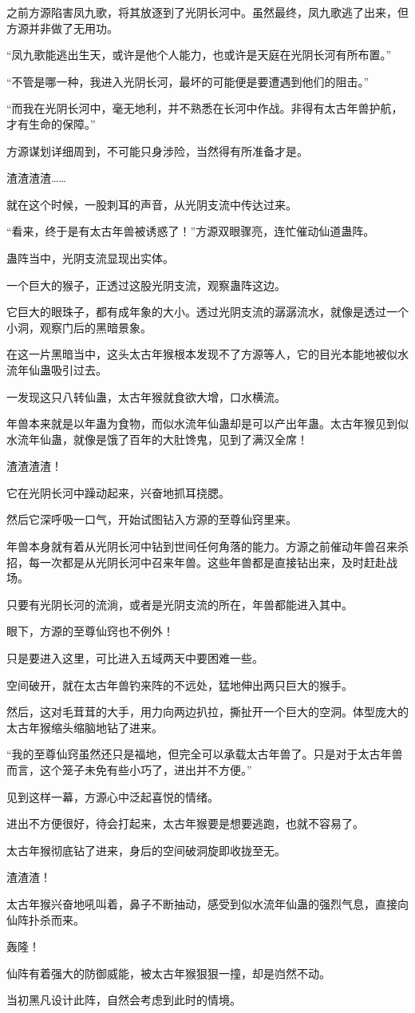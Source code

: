 \begin{this_body}
之前方源陷害凤九歌，将其放逐到了光阴长河中。虽然最终，凤九歌逃了出来，但方源并非做了无用功。

“凤九歌能逃出生天，或许是他个人能力，也或许是天庭在光阴长河有所布置。”

“不管是哪一种，我进入光阴长河，最坏的可能便是要遭遇到他们的阻击。”

“而我在光阴长河中，毫无地利，并不熟悉在长河中作战。非得有太古年兽护航，才有生命的保障。”

方源谋划详细周到，不可能只身涉险，当然得有所准备才是。

渣渣渣渣……

就在这个时候，一股刺耳的声音，从光阴支流中传达过来。

“看来，终于是有太古年兽被诱惑了！”方源双眼骤亮，连忙催动仙道蛊阵。

蛊阵当中，光阴支流显现出实体。

一个巨大的猴子，正透过这股光阴支流，观察蛊阵这边。

它巨大的眼珠子，都有成年象的大小。透过光阴支流的潺潺流水，就像是透过一个小洞，观察门后的黑暗景象。

在这一片黑暗当中，这头太古年猴根本发现不了方源等人，它的目光本能地被似水流年仙蛊吸引过去。

一发现这只八转仙蛊，太古年猴就食欲大增，口水横流。

年兽本来就是以年蛊为食物，而似水流年仙蛊却是可以产出年蛊。太古年猴见到似水流年仙蛊，就像是饿了百年的大肚馋鬼，见到了满汉全席！

渣渣渣渣！

它在光阴长河中躁动起来，兴奋地抓耳挠腮。

然后它深呼吸一口气，开始试图钻入方源的至尊仙窍里来。

年兽本身就有着从光阴长河中钻到世间任何角落的能力。方源之前催动年兽召来杀招，每一次都是从光阴长河中召来年兽。这些年兽都是直接钻出来，及时赶赴战场。

只要有光阴长河的流淌，或者是光阴支流的所在，年兽都能进入其中。

眼下，方源的至尊仙窍也不例外！

只是要进入这里，可比进入五域两天中要困难一些。

空间破开，就在太古年兽钓来阵的不远处，猛地伸出两只巨大的猴手。

然后，这对毛茸茸的大手，用力向两边扒拉，撕扯开一个巨大的空洞。体型庞大的太古年猴缩头缩脑地钻了进来。

“我的至尊仙窍虽然还只是福地，但完全可以承载太古年兽了。只是对于太古年兽而言，这个笼子未免有些小巧了，进出并不方便。”

见到这样一幕，方源心中泛起喜悦的情绪。

进出不方便很好，待会打起来，太古年猴要是想要逃跑，也就不容易了。

太古年猴彻底钻了进来，身后的空间破洞旋即收拢至无。

渣渣渣！

太古年猴兴奋地吼叫着，鼻子不断抽动，感受到似水流年仙蛊的强烈气息，直接向仙阵扑杀而来。

轰隆！

仙阵有着强大的防御威能，被太古年猴狠狠一撞，却是岿然不动。

当初黑凡设计此阵，自然会考虑到此时的情境。

\end{this_body}

